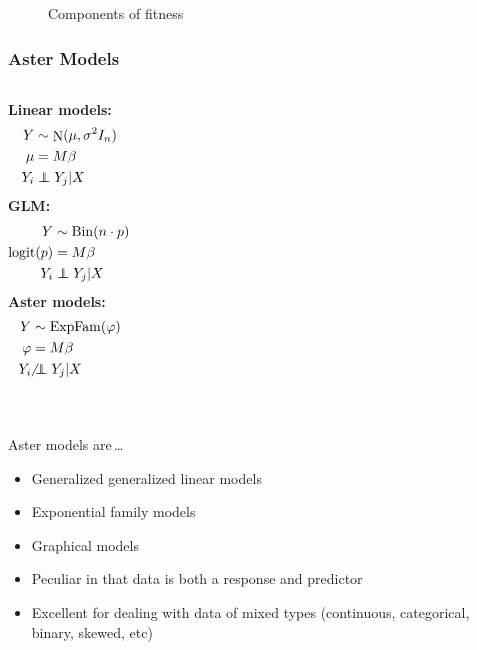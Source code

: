 \documentclass[table]{beamer}
\DeclareMathOperator{\Bin}{Bin}
\DeclareMathOperator{\Norm}{N}
\DeclareMathOperator{\logit}{logit}
\DeclareMathOperator{\ExpFam}{ExpFam}
\newcommand\ind{\protect\mathpalette{\protect\independenT}{\perp}}
\def\independenT#1#2{\mathrel{\rlap{$#1#2$}\mkern2mu{#1#2}}}
\begin{document}
\begin{frame}
\begin{center}
\begin{figure}[htb]
{
}
\caption{Components of fitness}
\label{fig:chamaecrista_aster_graph}
\end{figure}
\end{center}
\end{frame}

\begin{frame}
  \frametitle{Aster Models}
  \begin{columns}[t]
    \textbf{Linear models:}
  \begin{align*}
    Y &\sim \Norm(\mu, \sigma^2 I_n) \\
    \mu &= M\beta \\
    Y_i &\ind Y_j | X
  \end{align*}
    \textbf{GLM:}
  \begin{align*}
    Y &\sim \Bin(n \cdot p) \\
    \logit(p) &= M\beta \\
    Y_i &\ind Y_j | X
  \end{align*}
    \textbf{Aster models:}
  \begin{align*}
    Y &\sim \ExpFam(\varphi) \\
    \varphi &= M\beta \\
    Y_i  &\centernot \ind Y_j | X
  \end{align*}
  \end{columns}
    \hrulefill \\
Aster models are\,\ldots
  \begin{itemize}
    \item Generalized generalized linear models
    \item Exponential family models 
    \item Graphical models
    \item Peculiar in that data is both a response and predictor
    \item Excellent for dealing with data of mixed types (continuous,
      categorical, binary, skewed, etc)
  \end{itemize}
\end{frame}
\end{document}
